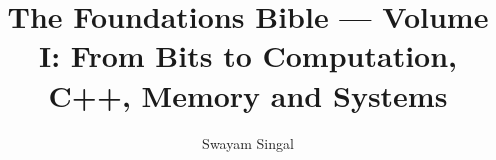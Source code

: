 \documentclass[11pt,twoside]{book}
\title{The Foundations Bible --- Volume I: From Bits to Computation, C++, Memory and Systems}
\author{Swayam Singal}
\begin{document}
\maketitle
\hypertarget{volume-reading-map}{}
\tableofcontents
\mainmatter




















\appendix
\end{document}

